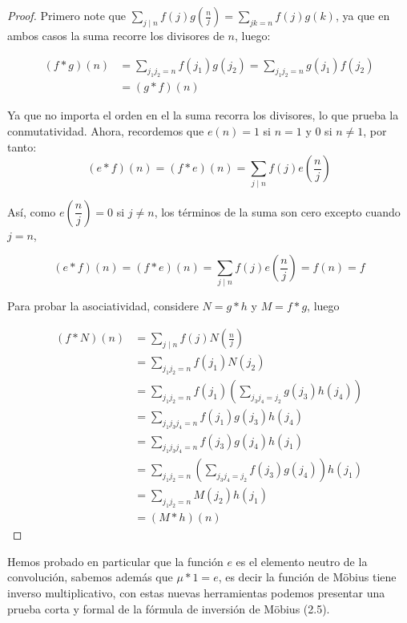 \begin{proof}

Primero note que $\displaystyle\sum_{j\mid n} f(j)g \left( \frac{n}{j} \right)=\sum_{jk=n} f(j)g(k)$, ya que en ambos casos la suma recorre los divisores de $n$, luego:

$$\begin{aligned}
(f * g)(n) & =\sum_{j_1 j_2=n} f\left(j_1\right) g\left(j_2\right )=\sum_{j_1 j_2=n} g\left(j_1\right) f\left(j_2\right) \\
& =(g * f)(n)
\end{aligned}$$

Ya que no importa el orden en el la suma recorra los divisores, lo que prueba la conmutatividad. Ahora, recordemos que $e(n)=1$ si $n=1$ y 0 si $n\neq 1$, por tanto:
$$(e*f)(n)=(f*e)(n)=\sum_{j\mid n}f(j)e \left( \frac{n}{j} \right)$$

Así, como $e \left( \dfrac{n}{j} \right)=0$ si $j\neq n$, los términos de la suma son cero excepto cuando $j=n$, 

$$(e*f)(n)=(f*e)(n)=\sum_{j\mid n}f(j)e \left( \frac{n}{j} \right)=f(n)=f$$

Para probar la asociatividad, considere $N=g*h$ y $M=f*g$, luego

$$
\begin{aligned}
(f * N)(n) & =\sum_{j \mid n} f(j) N\left(\frac{n}{j}\right) \\
& =\sum_{j_1 j_2=n} f\left(j_1\right) N\left(j_2\right) \\
& =\sum_{j_1 j_2=n} f\left(j_1\right)\left(\sum_{j_3 j_4=j_2} g\left(j_3\right) h\left(j_4\right)\right) \\
& =\sum_{j_1 j_3 j_4=n} f\left(j_1\right) g\left(j_3\right) h\left(j_4\right)\\
& =\sum_{j_1 j_3 j_4=n} f\left(j_3\right) g\left(j_4\right) h\left(j_1\right)\\
& =\sum_{j_1 j_2=n}\left(\sum_{j_3 j_4=j_2} f\left(j_3\right) g\left(j_4\right)\right) h\left(j_1\right)\\
& =\sum_{j_1 j_2=n} M\left(j_2\right) h\left(j_1\right)\\
&=(M * h)(n)
\end{aligned}
$$

\end{proof}

Hemos  probado en particular que la función $e$ es el elemento neutro de la convolución, sabemos además que $\mu *1=e$, es decir la función de Möbius tiene inverso multiplicativo, con estas nuevas herramientas podemos presentar una prueba corta y formal de la fórmula de inversión de Möbius (2.5).

